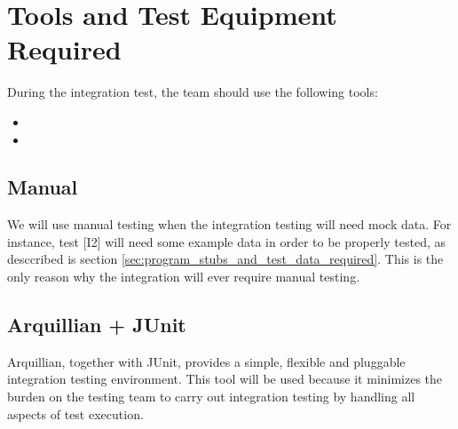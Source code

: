 \section{Tools and Test Equipment Required} %
\label{sec:tools_and_test_equipment_required}

During the integration test, the team should use the following tools:
\begin{itemize}
	\item {}
	\item {}
\end{itemize}

\subsection{Manual} %
\label{sub:manual}

We will use manual testing when the integration testing will need mock data.
For instance, test [I2] will need some example data in order to be properly tested, as desccribed is section \ref{sec:program_stubs_and_test_data_required}.
This is the only reason why the integration will ever require manual testing.

\subsection{Arquillian + JUnit} %
\label{sub:arquillian}
Arquillian, together with JUnit, provides a simple, flexible and pluggable integration testing environment.
This tool will be used because it minimizes the burden on the testing team to carry out integration testing by handling all aspects of test execution.


